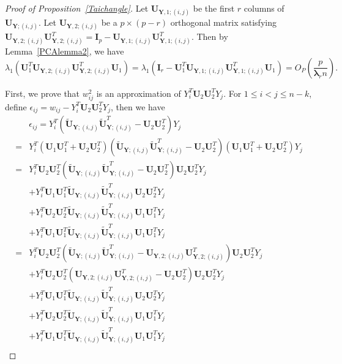 \documentclass[12pt]{article} %
\newcommand{\bY}{\mathbf{Y}}
\newcommand{\bI}{\mathbf{I}}
\newcommand{\bU}{\mathbf{U}}
\newcommand{\bfsym}[1]{\ensuremath{\boldsymbol{#1}}}
\def\blambda {\bfsym {\lambda}}
\theoremstyle{definition}
\begin{document}
    \begin{proof}[Proof of Proposition~\ref{Taichangle}]
        Let $\bU_{\bY,1;(i,j)}$ be the first $r$ columns of $\bU_{\bY;(i,j)}$.
        Let $\bU_{\bY,2;(i,j)}$ be a $p\times (p-r)$ orthogonal matrix satisfying $\bU_{\bY,2;(i,j)}\bU_{\bY,2;(i,j)}^T= \bI_p-\bU_{\bY,1;(i,j)}\bU_{\bY,1;(i,j)}^T$.
        Then by Lemma~\ref{PCAlemma2}, we have
        $$
        \lambda_1(\bU_1^T \bU_{\bY,2;(i,j)}\bU_{\bY,2;(i,j)}^T \bU_1)
        =
        \lambda_1(\bI_r-\bU_1^T \bU_{\bY,1;(i,j)}\bU_{\bY,1;(i,j)}^T \bU_1)
        =
        O_P(\frac{p}{\blambda_r n}).
        $$


        First, we prove that $w_{ij}^2$ is an approximation of $Y_i^T \bU_2 \bU_2^T Y_j$.
        For $1\leq i<j\leq n-k$, define $\epsilon_{ij}= w_{ij}-Y_i^T \bU_{2} \bU_{2}^T Y_j$, then we have
        \begin{equation}\label{emLong}
    \begin{aligned}
        &\epsilon_{ij}
        =Y_i^T (\tilde{\bU}_{\bY;(i,j)} \tilde{\bU}_{\bY;(i,j)}^T-\bU_2 \bU_2^T) Y_j\\
        =&Y_i^T(\bU_1 \bU_1^T+\bU_2 \bU_2^T) (\tilde{\bU}_{\bY;(i,j)} \tilde{\bU}_{\bY;(i,j)}^T-\bU_2 \bU_2^T)(\bU_1 \bU_1^T+\bU_2 \bU_2^T) Y_j\\
        =&Y_i^T \bU_2 \bU_2^T (\tilde{\bU}_{\bY;(i,j)} \tilde{\bU}_{\bY;(i,j)}^T-\bU_2\bU_2^T) \bU_2 \bU_2^T Y_j\\
        &+Y_i^T \bU_1 \bU_1^T \tilde{\bU}_{\bY;(i,j)} \tilde{\bU}_{\bY;(i,j)}^T \bU_2 \bU_2^T Y_j\\
        &+Y_i^T \bU_2 \bU_2^T \tilde{\bU}_{\bY;(i,j)} \tilde{\bU}_{\bY;(i,j)}^T \bU_1 \bU_1^T Y_j\\
        &+Y_i^T \bU_1 \bU_1^T \tilde{\bU}_{\bY;(i,j)} \tilde{\bU}_{\bY;(i,j)}^T \bU_1 \bU_1^T Y_j\\
        =&
            Y_i^T\bU_2 \bU_2^T ( \tilde{\bU}_{\bY;(i,j)} \tilde{\bU}_{\bY;(i,j)}^T-\bU_{\bY,2;(i,j)} \bU_{\bY,2;(i,j)}^T)\bU_2 \bU_2^T Y_j\\
            &+
            Y_i^T \bU_2 \bU_2^T(\bU_{\bY,2;(i,j)} \bU_{\bY,2;(i,j)}^T-\bU_2 \bU_2^T)\bU_2 \bU_2^T Y_j\\
        &+Y_i^T \bU_1 \bU_1^T \tilde{\bU}_{\bY;(i,j)} \tilde{\bU}_{\bY;(i,j)}^T \bU_2 \bU_2^T Y_j\\
        &+Y_i^T \bU_2 \bU_2^T \tilde{\bU}_{\bY;(i,j)} \tilde{\bU}_{\bY;(i,j)}^T \bU_1 \bU_1^T Y_j\\
        &+Y_i^T \bU_1 \bU_1^T \tilde{\bU}_{\bY;(i,j)} \tilde{\bU}_{\bY;(i,j)}^T \bU_1 \bU_1^T Y_j\\

\end{aligned}
\end{equation}
\end{proof}
\end{document}
